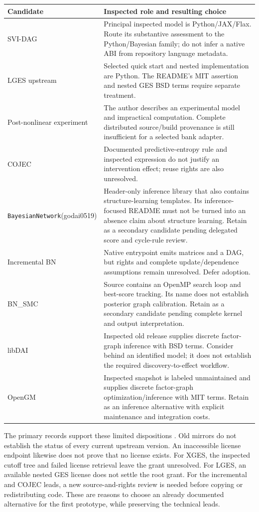 \begin{longtable}{@{}p{.26\linewidth}p{.66\linewidth}@{}}
\toprule
Candidate & Inspected role and resulting choice\\
\midrule
\endhead
SVI-DAG & Principal inspected model is Python/JAX/Flax. Route its substantive
assessment to the Python/Bayesian family; do not infer a native ABI from
repository language metadata.\\
LGES upstream & Selected quick start and nested implementation are Python.
The README's MIT assertion and nested GES BSD terms require separate treatment.\\
Post-nonlinear experiment & The author describes an experimental model and
impractical computation. Complete distributed source/build provenance is still
insufficient for a selected bank adapter.\\
COJEC & Documented predictive-entropy rule and inspected expression do not
justify an intervention effect; reuse rights are also unresolved.\\
\texttt{BayesianNetwork}\newline (godai0519) & Header-only inference library that also
contains structure-learning templates. Its inference-focused README must not
be turned into an absence claim about structure learning. Retain as a
secondary candidate pending delegated score and cycle-rule review.\\
Incremental BN & Native entrypoint emits matrices and a DAG, but rights and
complete update/dependence assumptions remain unresolved. Defer adoption.\\
BN\_SMC & Source contains an OpenMP search loop and best-score tracking. Its
name does not establish posterior graph calibration. Retain as a secondary
candidate pending complete kernel and output interpretation.\\
libDAI & Inspected old release supplies discrete factor-graph inference with
BSD terms. Consider behind an identified model; it does not establish the
required discovery-to-effect workflow.\\
OpenGM & Inspected snapshot is labeled unmaintained and supplies discrete
factor-graph optimization/inference with MIT terms. Retain as an inference
alternative with explicit maintenance and integration costs.\\
\bottomrule
\end{longtable}

The primary records support these limited dispositions
\citep{exec13_cxx_svidag,exec13_cxx_lges,exec13_cxx_other_leads,
exec13_cxx_inference}. Old mirrors do not establish the status of every
current upstream version. An inaccessible license endpoint likewise does
not prove that no license exists. For XGES, the inspected cutoff tree and
failed license retrieval leave the grant unresolved. For LGES, an available
nested GES license does not settle the root grant. For the incremental and
COJEC leads, a new source-and-rights review is needed before copying or
redistributing code. These are reasons to choose an already documented
alternative for the first prototype, while preserving the technical leads.

